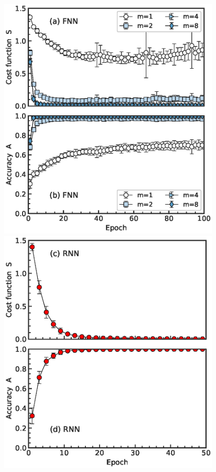 \begin{figure}[]
	\centering
	\begin{minipage}[t]{\columnwidth}
		\centering
		\includegraphics[width=\textwidth]{./figs/FIG3AB.eps}
	\end{minipage}%
	\begin{minipage}[t]{\columnwidth}
		\centering
		\includegraphics[width=\textwidth]{./figs/FIG3CD.eps}

\end{minipage}
\end{figure}
